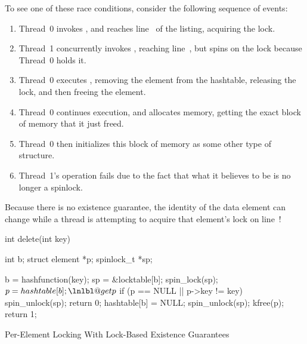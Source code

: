 \begin{fcvref}
To see one of these race conditions, consider the following sequence
of events:
\begin{enumerate}
\item	Thread~0 invokes , and reaches line~ of
	the listing, acquiring the lock.
\item	Thread~1 concurrently invokes , reaching
	line~, but spins on the lock because Thread~0 holds it.
\item	Thread~0 executes , removing the element from
	the hashtable, releasing the lock, and then freeing the
	element.
\item	Thread~0 continues execution, and allocates memory, getting
	the exact block of memory that it just freed.
\item	Thread~0 then initializes this block of memory as some
	other type of structure.
\item	Thread~1's  operation fails due to the
	fact that what it believes to be  is no longer
	a spinlock.
\end{enumerate}
Because there is no existence guarantee, the identity of the
data element can change while a thread is attempting to acquire
that element's lock on line~!
\end{fcvref}

\begin{listing}[tbp]
\begin{fcvlabel}
\begin{VerbatimL}[commandchars=\\\@\$]
int delete(int key)
{
	int b;
	struct element *p;
	spinlock_t *sp;

	b = hashfunction(key);
	sp = &locktable[b];
	spin_lock(sp);				\lnlbl@acq$
	p = hashtable[b];			\lnlbl@getp$
	if (p == NULL || p->key != key) {
		spin_unlock(sp);
		return 0;
	}
	hashtable[b] = NULL;
	spin_unlock(sp);
	kfree(p);
	return 1;
}
\end{VerbatimL}
\end{fcvlabel}
\caption{Per-Element Locking With Lock-Based Existence Guarantees}
\label{lst:locking:Per-Element Locking With Lock-Based Existence Guarantees}
\end{listing}

